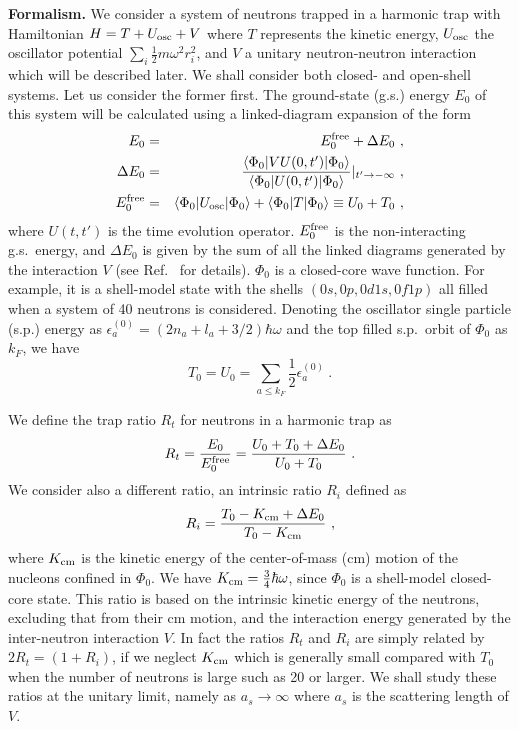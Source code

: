 \documentclass[twocolumn,preprintnumbers,superscriptaddress]{revtex4}
\begin{document}
\vskip 0.5cm
{\bf Formalism.}
We consider a system of neutrons trapped
in a harmonic trap with Hamiltonian $H=T+U_{\rm osc}+V$ where
$T$ represents the kinetic energy, $U_{\rm osc}$ the oscillator potential
$\sum_i \frac{1}{2}m\omega ^2 r_i^2$, and $V$ a unitary neutron-neutron
interaction which will be described later.
We shall consider both closed- and open-shell systems.
Let us consider the former first.
The ground-state (g.s.)
energy $E_0$ of this system
will be calculated
using a linked-diagram expansion \cite{Goldstone,Kuo1971,Kuo1990} of the form
\begin{eqnarray}
E_0  &=& E_0^{\rm free} + \Delta E_0~, \nonumber \\
 \Delta E_0 &=&
     \frac{ \langle\Phi_0|V U(0,t')|\Phi_0\rangle}
         { \langle\Phi_0| U(0,t')|\Phi_0\rangle}|_{t'\rightarrow -\infty}~,
     \\
 E_0^{\rm free}&=& \langle\Phi_0|U_{\rm osc}|\Phi_0\rangle
+\langle\Phi_0|T|\Phi_0\rangle \equiv U_0 + T_0~,  \nonumber
\end{eqnarray}
where $ U(t,t')$ is the time evolution operator. $E_0^{\rm free}$ is
the non-interacting g.s.~energy, and $\Delta E_0$ is given by the sum of
all the linked diagrams generated by the interaction $V$ (see Ref.~\cite{Siu2008} for details).
$\Phi _0$ is a closed-core wave function. For example, it is a shell-model
state with the shells $(0s,0p,0d1s,0f1p)$
all filled when a system of 40 neutrons is considered.
Denoting the oscillator single particle (s.p.) energy as
$\epsilon ^{(0)}_a=(2n_a + l_a +3/2)\hbar \omega$ and the top filled
s.p.~orbit of $\Phi_0$ as $k_F$,  we have
\begin{equation}
 T_0=U_0= \sum\limits_{a\leq k_F} \frac{1}{2} \epsilon^{(0)}_a~.
\end{equation}

We define the trap ratio $R_t$ for neutrons in a harmonic trap as
\begin{equation}
R_t = \frac{E_0}{E_0^{\rm free}}=\frac{U_0+T_0+\Delta E_0}{U_0+T_0}~. \label{Rt}
\end{equation}
We consider also a different ratio, an intrinsic ratio $R_i$
defined as
\begin{equation}
R_i =\frac{T_0-K_{\rm cm}+\Delta E_0}{T_0-K_{\rm cm}}~, \label{Ri}
\end{equation}
where $K_{\rm cm}$ is the kinetic energy of the center-of-mass (cm)
motion of the nucleons confined in $\Phi _0$.
We have  $K_{\rm cm}= \frac{3}{4}\hbar\omega$, since $\Phi_0$
is a shell-model closed-core state.
This ratio is based on the intrinsic kinetic energy of the neutrons,
excluding that from their cm motion, and the interaction energy  generated
by the inter-neutron interaction $V$.
In fact the ratios $R_t$ and $R_i$ are simply related by $2R_t= (1+R_i)$, if we neglect
$K_{\rm cm}$ which is generally small compared with $T_0$ when the number
of neutrons is large such as 20 or larger.
We shall study these ratios at the unitary limit, namely
as $a_s\rightarrow \infty$ where $a_s$ is the scattering length of $V$.
\end{document}
